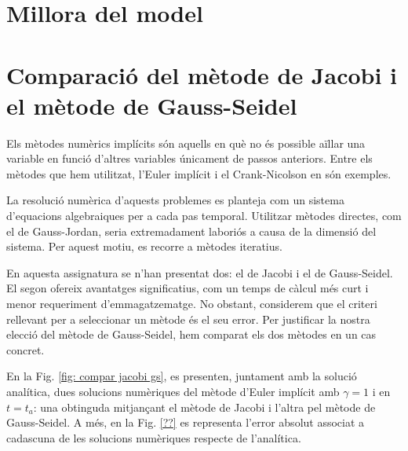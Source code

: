 \documentclass[11pt]{article}
\begin{document}
\section{Millora del model}



\section{Comparació del mètode de Jacobi i el mètode de Gauss-Seidel}

Els mètodes numèrics implícits són aquells en què no és possible aïllar una variable en funció d'altres variables únicament de passos anteriors. Entre els mètodes que hem utilitzat, l’Euler implícit i el Crank-Nicolson en són exemples.

La resolució numèrica d’aquests problemes es planteja com un sistema d’equacions algebraiques per a cada pas temporal. Utilitzar mètodes directes, com el de Gauss-Jordan, seria extremadament laboriós a causa de la dimensió del sistema. Per aquest motiu, es recorre a mètodes iteratius.

En aquesta assignatura se n'han presentat dos: el de Jacobi i el de Gauss-Seidel. El segon ofereix avantatges significatius, com un temps de càlcul més curt i menor requeriment d'emmagatzematge. No obstant, considerem que el criteri rellevant per a seleccionar un mètode és el seu error. Per justificar la nostra elecció del mètode de Gauss-Seidel, hem comparat els dos mètodes en un cas concret.

En la Fig. \ref{fig: compar jacobi gs}, es presenten, juntament amb la solució analítica, dues solucions numèriques del mètode d'Euler implícit amb $\gamma=1$ i en $t=t_a$: una obtinguda mitjançant el mètode de Jacobi i l'altra pel mètode de Gauss-Seidel. A més, en la Fig. \ref{??} es representa l'error absolut associat a cadascuna de les solucions numèriques respecte de l'analítica.
\end{document}
